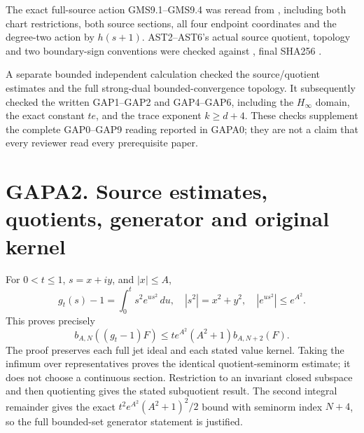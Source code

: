 The exact full-source action GMS9.1--GMS9.4 was reread from
\href{https://github.com/KokunoYumeto/zeta-function-research-reader/blob/36a82ecca98addb8a98b48204e349737856c7223/workbenches/splitzero-tandem/continuations/20260924-cohomology-weight-and-character-lifts/geometric-positive-quotient/sources/programme/cc_sheaf/CC_GLOBAL_MULTIPLIER_SEPARATION.md}{},
including both chart restrictions, both source sections, all four
endpoint coordinates and the degree-two action by \(h(s+1)\).
AST2--AST6's actual source quotient, topology and two boundary-sign
conventions were checked against
\href{https://github.com/KokunoYumeto/zeta-function-research-reader/blob/main/workbenches/splitzero-tandem/continuations/20260925-full-source-tensor-and-original-divisor/gct/ADJOINT_DEFECT_SOURCE_TOPOLOGY_COMPARISON.md}{},
final SHA256
.

A separate bounded independent calculation checked the source/quotient
estimates and the full strong-dual bounded-convergence topology. It
subsequently checked the written GAP1--GAP2 and GAP4--GAP6, including
the \(H_\infty\) domain, the exact constant \(te\), and the trace
exponent \(k\ge d+4\). These checks supplement the complete GAP0--GAP9
reading reported in GAPA0; they are not a claim that every reviewer read
every prerequisite paper.

\section{GAPA2. Source estimates, quotients, generator and original
kernel}\label{gapa2.-source-estimates-quotients-generator-and-original-kernel}

For \(0<t\le1\), \(s=x+iy\), and \(|x|\le A\), \[
g_t(s)-1=\int_0^t s^2e^{us^2}\,du,
\quad |s^2|=x^2+y^2,
\quad |e^{us^2}|\le e^{A^2}.
\] This proves precisely \[
b_{A,N}((g_t-1)F)
\le te^{A^2}(A^2+1)b_{A,N+2}(F).
\tag{GAPA2.1}
\] The proof preserves each full jet ideal and each stated value kernel.
Taking the infimum over representatives proves the identical
quotient-seminorm estimate; it does not choose a continuous section.
Restriction to an invariant closed subspace and then quotienting gives
the stated subquotient result. The second integral remainder gives the
exact \(t^2e^{A^2}(A^2+1)^2/2\) bound with seminorm index \(N+4\), so
the full bounded-set generator statement is justified.


